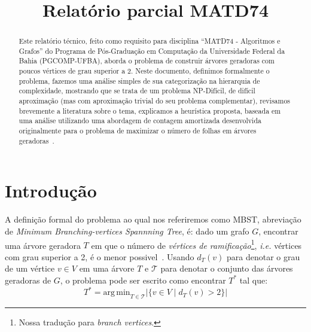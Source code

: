 \documentclass[conference]{IEEEtran}
\begin{document}
\title{Relatório parcial MATD74}

\author{
}

\maketitle

\begin{abstract}
  Este relatório t\'ecnico, feito como requisito para disciplina ``MATD74 - Algoritmos e Grafos'' do Programa de Pós-Graduação em Computação da Universidade Federal da Bahia (PGCOMP-UFBA), aborda o problema de construir árvores geradoras com poucos vértices de grau superior a 2.
  Neste documento, definimos formalmente o problema, fazemos uma análise simples de sua categorização na hierarquia de complexidade, mostrando que se trata de um problema NP-Difícil, de difícil aproximação (mas com aproximação trivial do seu problema complementar), revisamos brevemente a literatura sobre o tema, explicamos a heur\'istica proposta, baseada em uma an\'alise utilizando uma abordagem
  de contagem amortizada desenvolvida originalmente para o problema de maximizar o n\'umero de folhas
  em \'arvores geradoras~\cite{solis-oba2017}.
\end{abstract}

\section{Introdução}
A definição formal do problema ao qual nos referiremos como MBST, abreviação de \textit{Minimum Branching-vertices Spannning Tree}, é: dado um grafo $G$, encontrar uma árvore geradora $T$ em que o número de \emph{vértices de ramificação}\footnote{Nossa tradução para \textit{branch vertices}.}, \textit{i.e.} vértices com grau superior a 2, é o menor possivel~\cite{gargano2004}.
Usando $d_T(v)$ para denotar o grau de um vértice $v \in V$ em uma árvore $T$ e $\mathcal{T}$ para denotar o conjunto das árvores geradoras de $G$, o problema pode ser escrito como encontrar $T^*$ tal que:
\begin{equation}
  T^* = \mathrm{arg\,min}_{T \in \mathcal{T}} |\{v \in V \mid d_T(v) > 2 \}| 
\end{equation}
\end{document}
